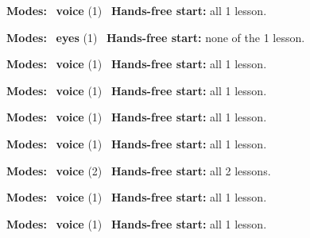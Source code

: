 \expandafter\def\csname hlchaptermodality222\endcsname{%
  {\small\noindent
    \textbf{Modes:} \hlvoicesign{}~\textbf{voice} (1)\quad
    \hlvoicesign{}~\textbf{Hands-free start:} all 1 lesson.%
    \par}\medskip
}

\expandafter\def\csname hlchaptermodality223\endcsname{%
  {\small\noindent
    \textbf{Modes:} \hlsightsign{}~\textbf{eyes} (1)\quad
    \hlvoicesign{}~\textbf{Hands-free start:} none of the 1 lesson.%
    \par}\medskip
}

\expandafter\def\csname hlchaptermodality224\endcsname{%
  {\small\noindent
    \textbf{Modes:} \hlvoicesign{}~\textbf{voice} (1)\quad
    \hlvoicesign{}~\textbf{Hands-free start:} all 1 lesson.%
    \par}\medskip
}

\expandafter\def\csname hlchaptermodality225\endcsname{%
  {\small\noindent
    \textbf{Modes:} \hlvoicesign{}~\textbf{voice} (1)\quad
    \hlvoicesign{}~\textbf{Hands-free start:} all 1 lesson.%
    \par}\medskip
}

\expandafter\def\csname hlchaptermodality226\endcsname{%
  {\small\noindent
    \textbf{Modes:} \hlvoicesign{}~\textbf{voice} (1)\quad
    \hlvoicesign{}~\textbf{Hands-free start:} all 1 lesson.%
    \par}\medskip
}

\expandafter\def\csname hlchaptermodality227\endcsname{%
  {\small\noindent
    \textbf{Modes:} \hlvoicesign{}~\textbf{voice} (1)\quad
    \hlvoicesign{}~\textbf{Hands-free start:} all 1 lesson.%
    \par}\medskip
}

\expandafter\def\csname hlchaptermodality228\endcsname{%
  {\small\noindent
    \textbf{Modes:} \hlvoicesign{}~\textbf{voice} (2)\quad
    \hlvoicesign{}~\textbf{Hands-free start:} all 2 lessons.%
    \par}\medskip
}

\expandafter\def\csname hlchaptermodality229\endcsname{%
  {\small\noindent
    \textbf{Modes:} \hlvoicesign{}~\textbf{voice} (1)\quad
    \hlvoicesign{}~\textbf{Hands-free start:} all 1 lesson.%
    \par}\medskip
}

\expandafter\def\csname hlchaptermodality230\endcsname{%
  {\small\noindent
    \textbf{Modes:} \hlvoicesign{}~\textbf{voice} (1)\quad
    \hlvoicesign{}~\textbf{Hands-free start:} all 1 lesson.%
    \par}\medskip
}

